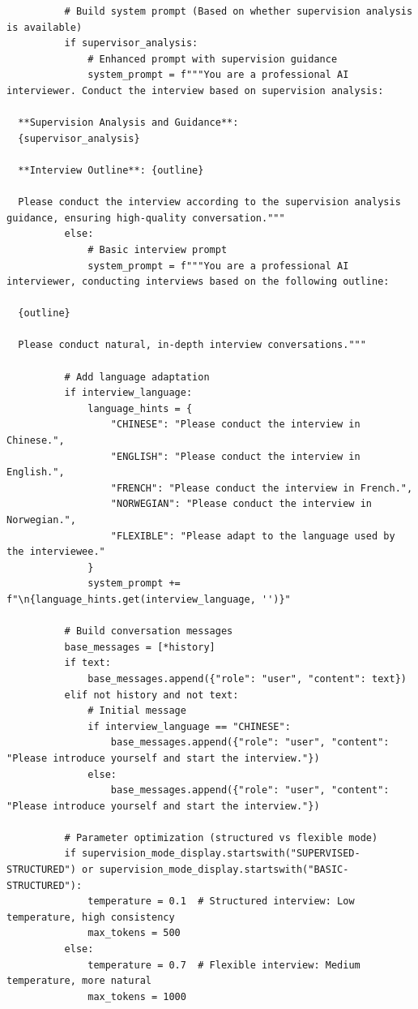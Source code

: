 \documentclass[sigchi,nonacm,manuscript]{acmart}
\begin{document}
\begin{lstlisting}
          # Build system prompt (Based on whether supervision analysis is available)
          if supervisor_analysis:
              # Enhanced prompt with supervision guidance
              system_prompt = f"""You are a professional AI interviewer. Conduct the interview based on supervision analysis:

  **Supervision Analysis and Guidance**:
  {supervisor_analysis}

  **Interview Outline**: {outline}

  Please conduct the interview according to the supervision analysis guidance, ensuring high-quality conversation."""
          else:
              # Basic interview prompt
              system_prompt = f"""You are a professional AI interviewer, conducting interviews based on the following outline:

  {outline}

  Please conduct natural, in-depth interview conversations."""
          
          # Add language adaptation
          if interview_language:
              language_hints = {
                  "CHINESE": "Please conduct the interview in Chinese.",
                  "ENGLISH": "Please conduct the interview in English.",
                  "FRENCH": "Please conduct the interview in French.",
                  "NORWEGIAN": "Please conduct the interview in Norwegian.",
                  "FLEXIBLE": "Please adapt to the language used by the interviewee."
              }
              system_prompt += f"\n{language_hints.get(interview_language, '')}"
          
          # Build conversation messages
          base_messages = [*history]
          if text:
              base_messages.append({"role": "user", "content": text})
          elif not history and not text:
              # Initial message
              if interview_language == "CHINESE":
                  base_messages.append({"role": "user", "content": "Please introduce yourself and start the interview."})
              else:
                  base_messages.append({"role": "user", "content": "Please introduce yourself and start the interview."})
          
          # Parameter optimization (structured vs flexible mode)
          if supervision_mode_display.startswith("SUPERVISED-STRUCTURED") or supervision_mode_display.startswith("BASIC-STRUCTURED"):
              temperature = 0.1  # Structured interview: Low temperature, high consistency
              max_tokens = 500
          else:
              temperature = 0.7  # Flexible interview: Medium temperature, more natural
              max_tokens = 1000
          

\end{lstlisting}
\end{document}
